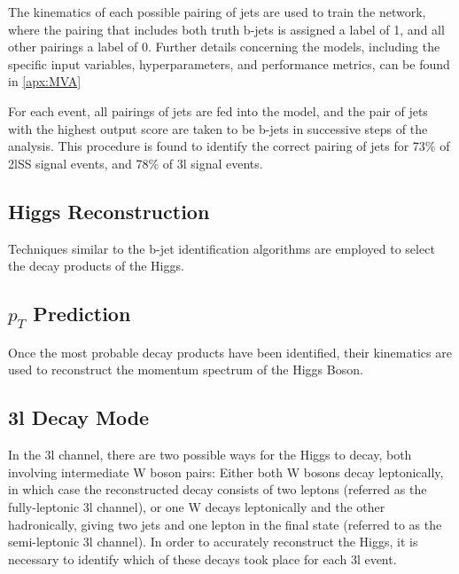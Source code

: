 The kinematics of each possible pairing of jets are used to train the network, where the pairing that includes both truth b-jets is assigned a label of 1, and all other pairings a label of 0. Further details concerning the models, including the specific input variables, hyperparameters, and performance metrics, can be found in \ref{apx:MVA}

For each event, all pairings of jets are fed into the model, and the pair of jets with the highest output score are taken to be b-jets in successive steps of the analysis. This procedure is found to identify the correct pairing of jets for 73\% of 2lSS signal events, and 78\% of 3l signal events. 


\subsection{Higgs Reconstruction}
\label{sec:higgsID}

Techniques similar to the b-jet identification algorithms are employed to select the decay products of the Higgs. 


\subsection{$p_T$ Prediction}
\label{sec:ptReco}

Once the most probable decay products have been identified, their kinematics are used to reconstruct the momentum spectrum of the Higgs Boson. 

\subsection{3l Decay Mode}
\label{sec:decay3l}

In the 3l channel, there are two possible ways for the Higgs to decay, both involving intermediate W boson pairs: Either both W bosons decay leptonically, in which case the reconstructed decay consists of two leptons (referred as the fully-leptonic 3l channel), or one W decays leptonically and the other hadronically, giving two jets and one lepton in the final state (referred to as the semi-leptonic 3l channel). In order to accurately reconstruct the Higgs, it is necessary to identify which of these decays took place for each 3l event.



